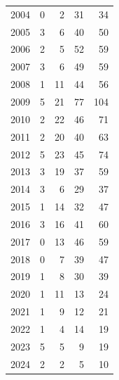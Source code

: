 \documentclass[
  english,
]{article}
\begin{document}
\begin{longtable}{rrrrr}
2004 & 0 & 2 & 31 & 34 \\ 
2005 & 3 & 6 & 40 & 50 \\ 
2006 & 2 & 5 & 52 & 59 \\ 
2007 & 3 & 6 & 49 & 59 \\ 
2008 & 1 & 11 & 44 & 56 \\ 
2009 & 5 & 21 & 77 & 104 \\ 
2010 & 2 & 22 & 46 & 71 \\ 
2011 & 2 & 20 & 40 & 63 \\ 
2012 & 5 & 23 & 45 & 74 \\ 
2013 & 3 & 19 & 37 & 59 \\ 
2014 & 3 & 6 & 29 & 37 \\ 
2015 & 1 & 14 & 32 & 47 \\ 
2016 & 3 & 16 & 41 & 60 \\ 
2017 & 0 & 13 & 46 & 59 \\ 
2018 & 0 & 7 & 39 & 47 \\ 
2019 & 1 & 8 & 30 & 39 \\ 
2020 & 1 & 11 & 13 & 24 \\ 
2021 & 1 & 9 & 12 & 21 \\ 
2022 & 1 & 4 & 14 & 19 \\ 
2023 & 5 & 5 & 9 & 19 \\ 
2024 & 2 & 2 & 5 & 10 \\ 
\bottomrule

\end{longtable}

\endgroup

\newpage{}

\begingroup
\fontsize{9.0pt}{11.0pt}\selectfont
\end{document}
